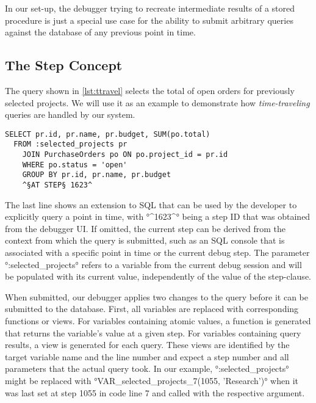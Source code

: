 \documentclass[english]{sig-alternate-05-2015}
\newcommand{\todo}[2][]{\pdfmargincomment[author={#1}]{#2}}
\begin{document}
In our set-up, the debugger trying to recreate intermediate results of a stored procedure is just a special use case for the ability to submit arbitrary queries against the database of any previous point in time.

\subsection{The Step Concept}

The query shown in \cref{lst:ttravel} selects the total of open orders for previously selected projects.
We will use it as an example to demonstrate how \emph{time-traveling} queries are handled by our system.

\begin{lstlisting}[language=HanaSQL,float,caption={Example for a time-travel query: select the current total of open orders for previously selected projects},label=lst:ttravel]
  SELECT pr.id, pr.name, pr.budget, SUM(po.total)
  FROM :selected_projects pr
	JOIN PurchaseOrders po ON po.project_id = pr.id
	WHERE po.status = 'open'
	GROUP BY pr.id, pr.name, pr.budget
	^§AT STEP§ 1623^
\end{lstlisting}

The last line shows an extension to SQL that can be used by the developer to explicitly query a point in time, with °^1623^° being a step ID that was obtained from the debugger UI.
If omitted, the current step can be derived from the context from which the query is submitted, such as an SQL console that is associated with a specific point in time or the current debug step.
The parameter °:selected_projects° refers to a variable from the current debug session and will be populated with its current value, independently of the value of the step-clause.

When submitted, our debugger applies two changes to the query before it can be submitted to the database.
First, all variables are replaced with corresponding functions or views.
For variables containing atomic values, a function is generated that returns the variable's value at a given step.
For variables containing query results, a view is generated for each query.
These views are identified by the target variable name and the line number and expect a step number and all parameters that the actual query took.
\todo{explain variable functions}
In our example, °:selected_projects° might be replaced with °VAR_selected_projects_7(1055, 'Research')° when it was last set at step 1055 in code line 7 and called with the respective argument.
\end{document}
